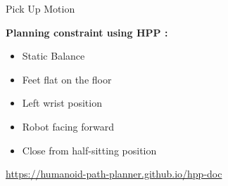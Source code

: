 
\begin{frame}{Pick Up Motion}
  \vspace*{0.6cm}
  \begin{center}
  \end{center}
%
  \vspace*{-1ex}
  \textbf{\color{txtcolor2} Planning constraint using HPP :}\\
%  
  \begin{minipage}{0.45\textwidth}
    \begin{itemize}
      \item Static Balance
      \item Feet flat on the floor
      \item Left wrist position
    \end{itemize}
  \end{minipage}
%
  \begin{minipage}{0.50\textwidth}
    \begin{itemize}
      \item Robot facing forward
      \item Close from half-sitting position
    \end{itemize}
    \vspace*{0.4cm}    
  \end{minipage}
%
  \begin{center}
    \small{\color{txtcolor3}\url{https://humanoid-path-planner.github.io/hpp-doc}}
  \end{center}
%
\end{frame}
